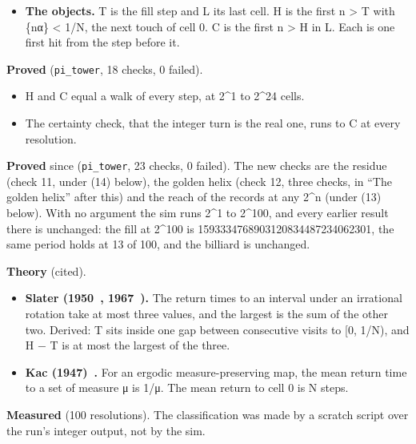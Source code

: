 \begin{itemize}
\item \textbf{The objects.} T is the fill step and L its last cell. H is the first n > T with \{nα\} < 1/N, the next touch of cell 0. C is the first n > H in L. Each is one first hit from the step before it.
\end{itemize}

\textbf{Proved} (\texttt{pi\_\allowbreak{}tower}, 18 checks, 0 failed).

\begin{itemize}
\item H and C equal a walk of every step, at 2\textasciicircum{}1 to 2\textasciicircum{}24 cells.
\item The certainty check, that the integer turn is the real one, runs to C at every resolution.
\end{itemize}

\textbf{Proved} since (\texttt{pi\_\allowbreak{}tower}, 23 checks, 0 failed). The new checks are the residue (check 11, under (14) below), the golden helix (check 12, three checks, in “The golden helix” after this) and the reach of the records at any 2\textasciicircum{}n (under (13) below). With no argument the sim runs 2\textasciicircum{}1 to 2\textasciicircum{}100, and every earlier result there is unchanged: the fill at 2\textasciicircum{}100 is 1593334768903120834487234062301, the same period holds at 13 of 100, and the billiard is unchanged.

\textbf{Theory} (cited).

\begin{itemize}
\item \textbf{Slater (1950~\cite{src:Slater-1950}, 1967~\cite{src:Slater-1967}).} The return times to an interval under an irrational rotation take at most three values, and the largest is the sum of the other two. Derived: T sits inside one gap between consecutive visits to [0, 1/N), and H − T is at most the largest of the three.
\item \textbf{Kac (1947)~\cite{src:Kac}.} For an ergodic measure-preserving map, the mean return time to a set of measure μ is 1/μ. The mean return to cell 0 is N steps.
\end{itemize}

\textbf{Measured} (100 resolutions). The classification was made by a scratch script over the run's integer output, not by the sim.

